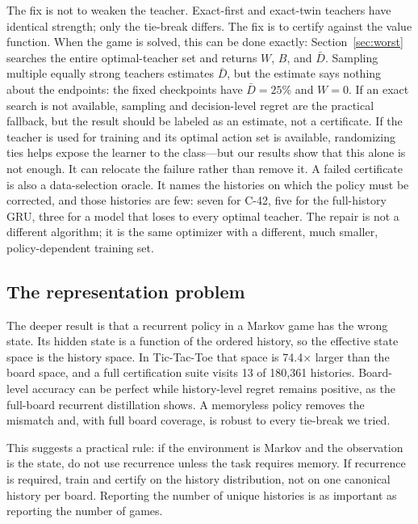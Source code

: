 \documentclass[conference]{IEEEtran}
\begin{document}
The fix is not to weaken the teacher. Exact-first and exact-twin teachers have identical strength; only the tie-break differs. The fix is to certify against the value function. When the game is solved, this can be done exactly: Section~\ref{sec:worst} searches the entire optimal-teacher set and returns $W$, $B$, and $\bar D$. Sampling multiple equally strong teachers estimates $\bar D$, but the estimate says nothing about the endpoints: the fixed checkpoints have $\bar D=25\%$ and $W=0$. If an exact search is not available, sampling and decision-level regret are the practical fallback, but the result should be labeled as an estimate, not a certificate. If the teacher is used for training and its optimal action set is available, randomizing ties helps expose the learner to the class---but our results show that this alone is not enough. It can relocate the failure rather than remove it. A failed certificate is also a data-selection oracle. It names the histories on which the policy must be corrected, and those histories are few: seven for C-42, five for the full-history GRU, three for a model that loses to every optimal teacher. The repair is not a different algorithm; it is the same optimizer with a different, much smaller, policy-dependent training set.

\subsection{The representation problem}
The deeper result is that a recurrent policy in a Markov game has the wrong state. Its hidden state is a function of the ordered history, so the effective state space is the history space. In Tic-Tac-Toe that space is 74.4$\times$ larger than the board space, and a full certification suite visits 13 of 180{,}361 histories. Board-level accuracy can be perfect while history-level regret remains positive, as the full-board recurrent distillation shows. A memoryless policy removes the mismatch and, with full board coverage, is robust to every tie-break we tried.

This suggests a practical rule: if the environment is Markov and the observation is the state, do not use recurrence unless the task requires memory. If recurrence is required, train and certify on the history distribution, not on one canonical history per board. Reporting the number of unique histories is as important as reporting the number of games.
\end{document}
